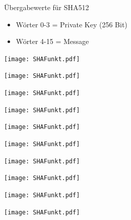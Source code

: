\begin{frame}{Übergabewerte für SHA512}
\protect\hypertarget{uxfcbergabewerte-fuxfcr-sha512}{}
\begin{itemize}
\item
  Wörter 0-3 = Private Key (256 Bit)
\item
  Wörter 4-15 = Message
\end{itemize}
\end{frame}

\begin{frame}{}
\protect\hypertarget{section-4}{}
\texttt{[image: SHAFunkt.pdf]}
\end{frame}

\begin{frame}{}
\protect\hypertarget{section-5}{}
\texttt{[image: SHAFunkt.pdf]}
\end{frame}

\begin{frame}{}
\protect\hypertarget{section-6}{}
\texttt{[image: SHAFunkt.pdf]}
\end{frame}

\begin{frame}{}
\protect\hypertarget{section-7}{}
\texttt{[image: SHAFunkt.pdf]}
\end{frame}

\begin{frame}{}
\protect\hypertarget{section-8}{}
\texttt{[image: SHAFunkt.pdf]}
\end{frame}

\begin{frame}{}
\protect\hypertarget{section-9}{}
\texttt{[image: SHAFunkt.pdf]}
\end{frame}

\begin{frame}{}
\protect\hypertarget{section-10}{}
\texttt{[image: SHAFunkt.pdf]}
\end{frame}

\begin{frame}{}
\protect\hypertarget{section-11}{}
\texttt{[image: SHAFunkt.pdf]}
\end{frame}

\begin{frame}{}
\protect\hypertarget{section-12}{}
\texttt{[image: SHAFunkt.pdf]}
\end{frame}

\begin{frame}{}
\protect\hypertarget{section-13}{}
\texttt{[image: SHAFunkt.pdf]}
\end{frame}

